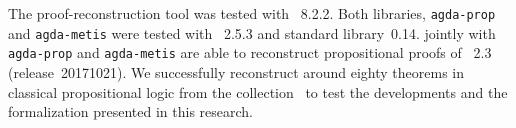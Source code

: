 \documentclass[../main.tex]{subfiles}
\begin{document}
The proof-reconstruction tool \Athena was tested with ~8.2.2.
Both libraries, \verb!agda-prop! and \verb!agda-metis! were tested with
\Agda~2.5.3 and \Agda standard library~0.14.
\Athena jointly with \verb!agda-prop! and \verb!agda-metis! are able
to reconstruct propositional proofs of \Metis~2.3 (release~20171021).
We successfully reconstruct around eighty theorems in classical propositional
logic from the \TPTP collection~\cite{Prieto-Cubides2017} to test
the developments and the formalization presented in this research.
\end{document}
